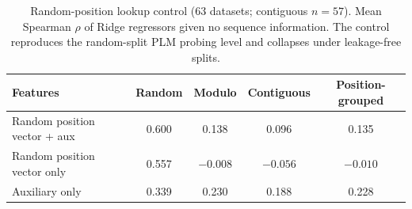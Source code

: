 \documentclass[numbered,webpdf,modern,large]{oup-authoring-template}
\newcommand{\rone}[1]{#1}
\begin{document}
\begin{table}[!tbp]
\centering
\caption{\rone{Random-position lookup control (63 datasets; contiguous $n = 57$).
Mean Spearman $\rho$ of Ridge regressors given no sequence information. The control
reproduces the random-split PLM probing level and collapses under leakage-free
splits.}}
\label{tab:control}
\begin{tabular}{lcccc}
\toprule
Features & Random & Modulo & Contiguous & Position-grouped \\
\midrule
Random position vector + aux & 0.600 & 0.138 & 0.096 & 0.135 \\
Random position vector only  & 0.557 & $-0.008$ & $-0.056$ & $-0.010$ \\
Auxiliary only               & 0.339 & 0.230 & 0.188 & 0.228 \\
\bottomrule
\end{tabular}
\end{table}
\end{document}
